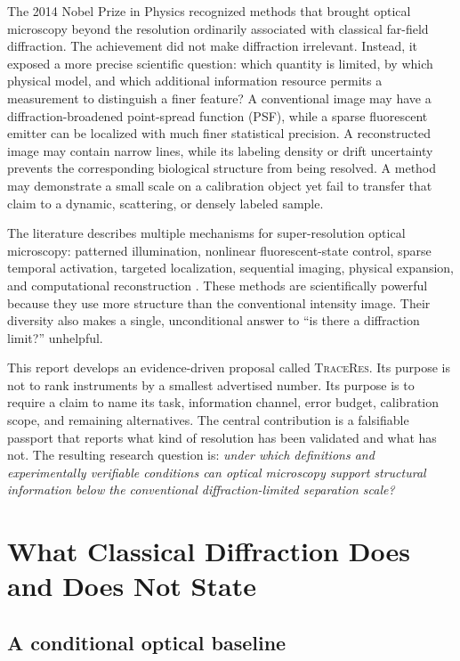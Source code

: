 \documentclass[conference]{IEEEtran}
\newcommand{\traceres}{\textsc{TraceRes}}
\begin{document}
The 2014 Nobel Prize in Physics recognized methods that brought optical microscopy beyond the resolution ordinarily associated with classical far-field diffraction. The achievement did not make diffraction irrelevant. Instead, it exposed a more precise scientific question: which quantity is limited, by which physical model, and which additional information resource permits a measurement to distinguish a finer feature? A conventional image may have a diffraction-broadened point-spread function (PSF), while a sparse fluorescent emitter can be localized with much finer statistical precision. A reconstructed image may contain narrow lines, while its labeling density or drift uncertainty prevents the corresponding biological structure from being resolved. A method may demonstrate a small scale on a calibration object yet fail to transfer that claim to a dynamic, scattering, or densely labeled sample.

The literature describes multiple mechanisms for super-resolution optical microscopy: patterned illumination, nonlinear fluorescent-state control, sparse temporal activation, targeted localization, sequential imaging, physical expansion, and computational reconstruction \cite{hell2015,huang2010}. These methods are scientifically powerful because they use more structure than the conventional intensity image. Their diversity also makes a single, unconditional answer to ``is there a diffraction limit?'' unhelpful.

This report develops an evidence-driven proposal called \traceres{}. Its purpose is not to rank instruments by a smallest advertised number. Its purpose is to require a claim to name its task, information channel, error budget, calibration scope, and remaining alternatives. The central contribution is a falsifiable passport that reports what kind of resolution has been validated and what has not. The resulting research question is: \emph{under which definitions and experimentally verifiable conditions can optical microscopy support structural information below the conventional diffraction-limited separation scale?}

\section{What Classical Diffraction Does and Does Not State}

\subsection{A conditional optical baseline}
\end{document}
